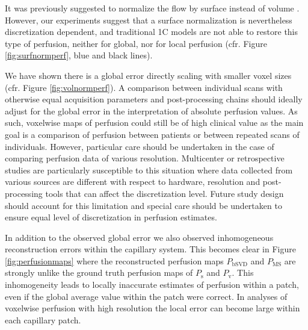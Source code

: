 \documentclass[10pt]{article}
\begin{document}

It was previously suggested to normalize the flow by surface instead of volume \cite{Guibert2013}. However, our experiments suggest that a surface normalization is nevertheless discretization dependent, and traditional 1C models are not able to restore this type of perfusion, neither for global, nor for local perfusion (cfr. Figure \ref{fig:surfnormperf}, blue and black lines).

We have shown there is a global error directly scaling with smaller voxel sizes (cfr. Figure \ref{fig:volnormperf}). A comparison between individual scans with otherwise equal acquisition parameters and post-processing chains should ideally adjust for the global error in the interpretation of absolute perfusion values. As such, voxelwise maps of perfusion could still be of high clinical value as the main goal is a comparison of perfusion between patients or between repeated scans of individuals. However, particular care should be undertaken in the case of comparing perfusion data of various resolution. Multicenter or retrospective studies are particularly susceptible to this situation where data collected from various sources are different with respect to hardware, resolution and post-processing tools that can affect the discretization level. Future study design should account for this limitation and special care should be undertaken to ensure equal level of discretization in perfusion estimates. 

In addition to the observed global error we also observed inhomogeneous reconstruction errors within the capillary system. This becomes clear in Figure \ref{fig:perfusionmaps} where the reconstructed perfusion maps $P_{\mathrm{bSVD}}$ and $P_{\mathrm{MS}}$ are strongly unlike the ground truth perfusion maps of $P_{\mathrm{s}}$ and $P_{\mathrm{v}}$. This inhomogeneity leads to locally inaccurate estimates of perfusion within a patch, even if the global average value within the patch were correct. 
In analyses of voxelwise perfusion with high resolution the local error can become large within each capillary patch.
 
\end{document}
